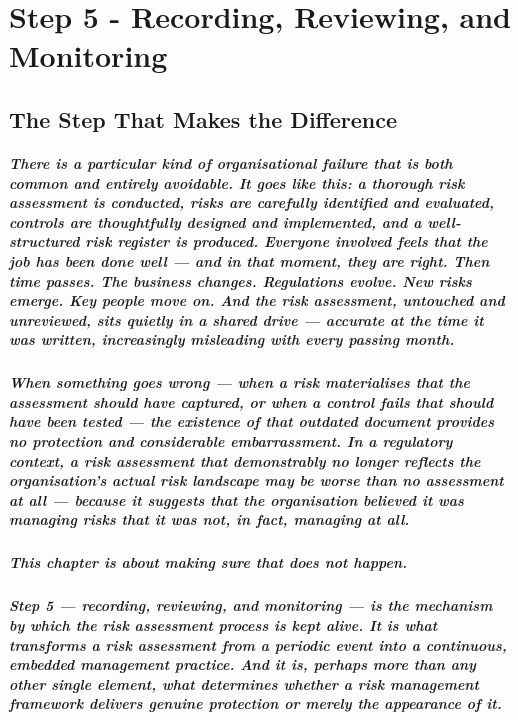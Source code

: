 \chapter{Step 5 - Recording, Reviewing, and Monitoring}
\label{chap:Step 5 - Recording, Reviewing, and Monitoring}

\section{The Step That Makes the Difference}
\paragraph{There is a particular kind of organisational failure that is both common and entirely avoidable. It goes like this: a thorough risk assessment is conducted, risks are carefully identified and evaluated, controls are thoughtfully designed and implemented, and a well-structured risk register is produced. Everyone involved feels that the job has been done well — and in that moment, they are right. Then time passes. The business changes. Regulations evolve. New risks emerge. Key people move on. And the risk assessment, untouched and unreviewed, sits quietly in a shared drive — accurate at the time it was written, increasingly misleading with every passing month.}
\paragraph{When something goes wrong — when a risk materialises that the assessment should have captured, or when a control fails that should have been tested — the existence of that outdated document provides no protection and considerable embarrassment. In a regulatory context, a risk assessment that demonstrably no longer reflects the organisation's actual risk landscape may be worse than no assessment at all — because it suggests that the organisation believed it was managing risks that it was not, in fact, managing at all.}
\paragraph{This chapter is about making sure that does not happen.}
\paragraph{Step 5 — recording, reviewing, and monitoring — is the mechanism by which the risk assessment process is kept alive. It is what transforms a risk assessment from a periodic event into a continuous, embedded management practice. And it is, perhaps more than any other single element, what determines whether a risk management framework delivers genuine protection or merely the appearance of it.}

